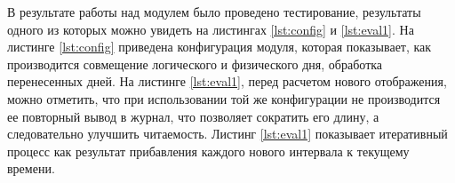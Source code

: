 \indent В результате работы над модулем было проведено тестирование, результаты одного из которых можно увидеть на листингах \ref{lst:config} и \ref{lst:eval1}.
На листинге \ref{lst:config} приведена конфигурация модуля, которая показывает, как производится совмещение логического и физического дня, обработка перенесенных дней.
На листинге \ref{lst:eval1}, перед расчетом нового отображения, можно отметить, что при использовании той же конфигурации не производится ее повторный вывод в журнал, что позволяет сократить его длину, а следовательно улучшить читаемость.
Листинг \ref{lst:eval1} показывает итеративный процесс как результат прибавления каждого нового интервала к текущему времени.

